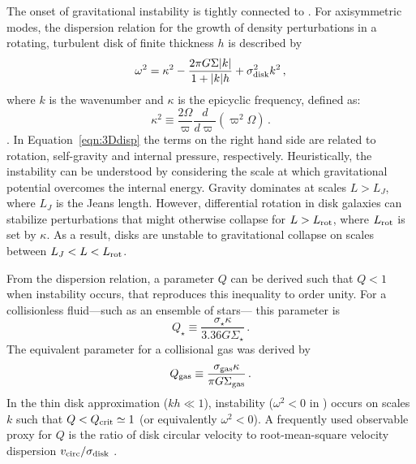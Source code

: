 \IfFileExists{emulateapjlegacy.cls}{\documentclass[iop]{emulateapjlegacy}}{\documentclass[iop]{emulateapj}}
\def\altomega{\varpi}
\begin{document}
The onset of gravitational instability is 
tightly connected to \SF \citep[e.g.,][]{Kennicutt89a, Wang94a, Li05b, Li06a}. 
For axisymmetric modes, the dispersion relation for the growth of density perturbations in a rotating, turbulent disk of finite thickness $h$ is described by
\begin{equation}
\omega^2 = \kappa^2 - \frac{2\pi G \Sigma |k|}{1 + |k| h} + \sigma_{\rm disk}^2 k^2\,,
\label{eqn:3Ddisp}
\end{equation}
where $k$ is the wavenumber and $\kappa$ is the epicyclic frequency, defined as:
\begin{equation}
\kappa^2\equiv\frac{2\Omega}{\altomega}\frac{d}{d\altomega}\left(\altomega^2\Omega\right)\,.
\label{eqn:kappa}
\end{equation}
\citep{Romeo92a}.
In Equation~\ref{eqn:3Ddisp} the terms on the right hand side are related to rotation, self-gravity and internal pressure, respectively. Heuristically, the instability can be understood by considering the scale at which gravitational potential overcomes the internal energy. Gravity dominates at scales $L > L_J$, where $L_J$ is the Jeans length. However, differential rotation in disk galaxies can stabilize perturbations that might otherwise collapse for $L > L_{\rm rot}$, where $L_{\rm rot}$ is set by $\kappa$. As a result, disks are unstable to gravitational collapse on scales between $L_J < L < L_{\rm rot}$.  

From the dispersion relation, a parameter $Q$ can be derived such that $Q < 1$ when instability occurs, that reproduces this inequality to order unity. For a collisionless fluid---such as an ensemble of stars--- this parameter is \citep{Toomre64a}
\begin{equation}
Q_{\star} \equiv\frac{\sigma_{\star}\kappa}{3.36 G \Sigma_{\star}}\,.
\end{equation}
The equivalent parameter for a collisional gas was derived by \citet{Goldreich65a}
\begin{equation}
Q_{\rm gas}\equiv\frac{\sigma_{\rm gas}\kappa}{\pi G \Sigma_{\rm gas}}\,.
\label{eqn:Q}
\end{equation}
In the thin disk approximation ($kh\ll1$), instability ($\omega^2 < 0$ in  ) occurs on scales $k$ such that $Q < Q_{\rm crit}\simeq1$ (or equivalently $\omega^2 < 0$). A frequently used observable proxy for $Q$ is the ratio of disk circular velocity to root-mean-square velocity dispersion $v_{\rm circ}/\sigma_{\rm disk}$ \citep[e.g.,][]{GarciaBurillo03a, Genzel11a, Kassin12a, Leung19a}.
%
\end{document}

